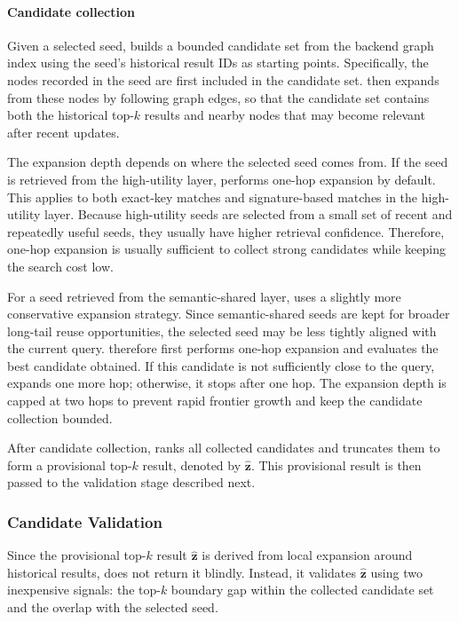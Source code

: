 \paragraph{Candidate collection}
Given a selected seed, \system builds a bounded candidate set from the backend graph index using the seed's historical result IDs as starting points. Specifically, the nodes recorded in the seed are first included in the candidate set. \system then expands from these nodes by following graph edges, so that the candidate set contains both the historical top-$k$ results and nearby nodes that may become relevant after recent updates.

The expansion depth depends on where the selected seed comes from.
If the seed is retrieved from the high-utility layer, \system performs one-hop expansion by default.
This applies to both exact-key matches and signature-based matches in the high-utility layer.
Because high-utility seeds are selected from a small set of recent and repeatedly useful seeds, they usually have higher retrieval confidence.
Therefore, one-hop expansion is usually sufficient to collect strong candidates while keeping the search cost low.

For a seed retrieved from the semantic-shared layer, \system uses a slightly more conservative expansion strategy.
Since semantic-shared seeds are kept for broader long-tail reuse opportunities, the selected seed may be less tightly aligned with the current query.
\system therefore first performs one-hop expansion and evaluates the best candidate obtained.
If this candidate is not sufficiently close to the query, \system expands one more hop; otherwise, it stops after one hop.
The expansion depth is capped at two hops to prevent rapid frontier growth and keep the candidate collection bounded.

After candidate collection, \system ranks all collected candidates and truncates them to form a provisional top-$k$ result, denoted by $\hat{\mathbf{z}}$.
This provisional result is then passed to the validation stage described next.





\subsubsection{Candidate Validation}
Since the provisional top-$k$ result $\hat{\mathbf{z}}$ is derived from local expansion around historical results, \system does not return it blindly.
Instead, it validates $\hat{\mathbf{z}}$ using two inexpensive signals: the top-$k$ boundary gap within the collected candidate set and the overlap with the selected seed.


